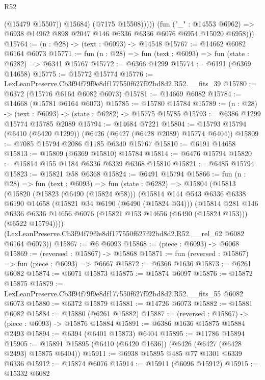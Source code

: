 \begin{lexlean}{R52}
\begin{coremodule}
                    (@15479 @15507))
                  @15684)
                (@7175 @15508)))))
        (fun ("_" : @14553 @6962) =>
        @6938 @14962 @898 @2047 @146 @6336 @6336 @6076 @6954 @15020 @6958)))
@15764 := (n : @28) -> (text : @6093) -> @14548
@15767 := @14662 @6082 @6164 @6073
@15771 := fun (n : @28) => fun (text : @6093) => fun (state : @6282) => @6341 @15767
@15772 := @6366 @1299
@15774 := @6191 (@6369 @14658)
@15775 := @15772 @15774
@15776 := LexLeanPreserve.Cb3f94f79f9e8df177550f627f92bd8d2.R52.__fits_39
@15780 := @6372 (@15776 @6164 @6082 @6073)
@15781 := @14669 @6082
@15784 := @14668 (@15781 @6164 @6073)
@15785 := @15780 @15784
@15789 := (n : @28) -> (text : @6093) -> (state : @6282) -> @15775 @15785
@15793 := @6386 @1299 @15774 @15785 @2089
@15794 := @14684 @7221
@15804 := @15793 @15794 (@6410 (@6420 @1299)) (@6426 (@6427 (@6428 @2089) @15774 @6404))
@15809 := @7085 @15794 @2086 @1185 @6340 @15767
@15810 := @6191 @14658
@15813 := @15809 (@6369 @15810) @15784
@15814 := @6476 @15794
@15820 := @15814 @155 @1184 @6336 @6339 @6368 @15810
@15821 := @6485 @15794
@15823 := @15821 @58 @6368
@15824 := @6491 @15794
@15866 := fun (n : @28) =>
  fun (text : @6093) =>
  fun (state : @6282) =>
  @15804
    (@15813
      (@15820
        (@15823 (@6490 (@15824 @58)))
        (@15814
          @144
          @543
          @6336
          @6338
          @6190
          @14658
          (@15821 @34 @6190 (@6490 (@15824 @34)))
          (@15814
            @281
            @146
            @6336
            @6336
            @14656
            @6076
            (@15821 @153 @14656 (@6490 (@15824 @153)))
            (@6522 @15794))))
      (LexLeanPreserve.Cb3f94f79f9e8df177550f627f92bd8d2.R52.__rel_62 @6082 @6164 @6073))
@15867 := @6 @6093
@15868 := (piece : @6093) -> @6068
@15869 := (reversed : @15867) -> @15868
@15871 := fun (reversed : @15867) => fun (piece : @6093) => @6667
@15872 := @6366 @1636
@15873 := @6261 @6082
@15874 := @6071 @15873
@15875 := @15874 @6097
@15876 := @15872 @15875
@15879 := LexLeanPreserve.Cb3f94f79f9e8df177550f627f92bd8d2.R52.__fits_55 @6082 @6073
@15880 := @6372 @15879
@15881 := @14726 @6073
@15882 := @15881 @6082
@15884 := @15880 (@6261 @15882)
@15887 := (reversed : @15867) -> (piece : @6093) -> @15876 @15884
@15891 := @6386 @1636 @15875 @15884 @2493
@15894 := @6394 (@6401 @15873) @6404
@15895 := @11786 @15894
@15905 := @15891 @15895 (@6410 (@6420 @1636)) (@6426 (@6427 (@6428 @2493) @15875 @6404))
@15911 := @6938 @15895 @485 @77 @1301 @6339 @6336
@15912 := @15874 @6076
@15914 := @15911 (@6096 @15912)
@15915 := @15332 @6082

\end{coremodule}
\end{lexlean}

